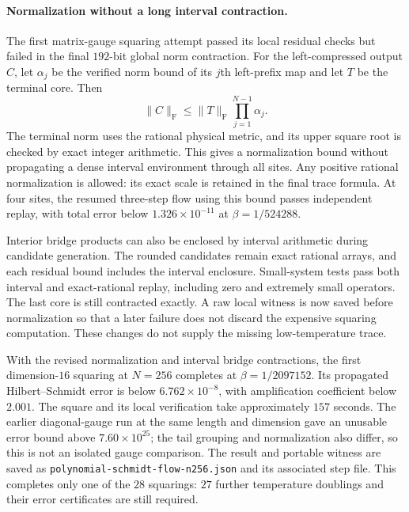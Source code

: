 \documentclass[11pt]{article}
\begin{document}
\paragraph{Normalization without a long interval contraction.}
The first matrix-gauge squaring attempt passed its local residual checks
but failed in the final $192$-bit global norm contraction. For the
left-compressed output $C$, let $\alpha_j$ be the verified norm bound
of its $j$th left-prefix map and let $T$ be the terminal core. Then
\[
 \|C\|_{\mathrm F}\le \|T\|_{\mathrm F}\prod_{j=1}^{N-1}\alpha_j.
\]
The terminal norm uses the rational physical metric, and its upper
square root is checked by exact integer arithmetic. This gives a
normalization bound without propagating a dense interval environment
through all sites. Any positive rational normalization is allowed:
its exact scale is retained in the final trace formula. At four sites,
the resumed three-step flow using this bound passes independent replay,
with total error below $1.326\times10^{-11}$ at
$\beta=1/524288$.

Interior bridge products can also be enclosed by interval arithmetic
during candidate generation. The rounded candidates remain exact
rational arrays, and each residual bound includes the interval
enclosure. Small-system tests pass both interval and exact-rational
replay, including zero and extremely small operators. The last core
is still contracted exactly. A raw local witness is now saved before
normalization so that a later failure does not discard the expensive
squaring computation. These changes do not supply the missing
low-temperature trace.

With the revised normalization and interval bridge contractions, the
first dimension-$16$ squaring at $N=256$ completes at
$\beta=1/2097152$. Its propagated Hilbert--Schmidt error is below
$6.762\times10^{-8}$, with amplification coefficient below $2.001$.
The square and its local verification take approximately $157$ seconds.
The earlier diagonal-gauge run at the same length and dimension gave an
unusable error bound above $7.60\times10^{25}$; the tail grouping and
normalization also differ, so this is not an isolated gauge comparison.
The result and portable witness are saved as
\texttt{polynomial-schmidt-flow-n256.json} and its associated step file.
This completes only one of the $28$ squarings: $27$ further temperature
doublings and their error certificates are still required.
\end{document}
